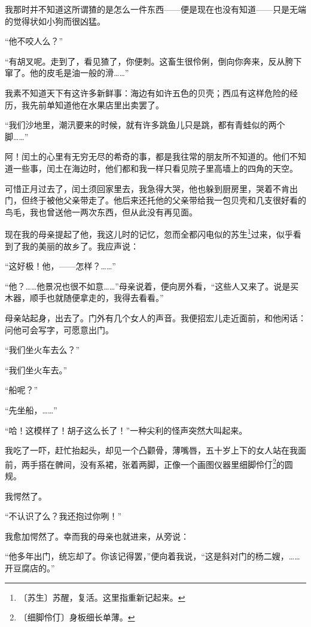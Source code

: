 \documentclass[12pt,UTF-8,openany]{ctexbook}
\begin{document}
\begin{normalsize}
    我那时并不知道这所谓猹的是怎么一件东西——便是现在也没有知道——只是无端的觉得状如小狗而很凶猛。
    
    “他不咬人么？”
    
    “有胡叉呢。走到了，看见猹了，你便刺。这畜生很伶俐，倒向你奔来，反从胯下窜了。他的皮毛是油一般的滑……”
    
    我素不知道天下有这许多新鲜事：海边有如许五色的贝壳；西瓜有这样危险的经历，我先前单知道他在水果店里出卖罢了。
    
    “我们沙地里，潮汛要来的时候，就有许多跳鱼儿只是跳，都有青蛙似的两个脚……”
    
    阿！闰土的心里有无穷无尽的希奇的事，都是我往常的朋友所不知道的。他们不知道一些事，闰土在海边时，他们都和我一样只看见院子里高墙上的四角的天空。
    
    可惜正月过去了，闰土须回家里去，我急得大哭，他也躲到厨房里，哭着不肯出门，但终于被他父亲带走了。他后来还托他的父亲带给我一包贝壳和几支很好看的鸟毛，我也曾送他一两次东西，但从此没有再见面。
    
    现在我的母亲提起了他，我这儿时的记忆，忽而全都闪电似的苏生\footnote{〔苏生〕苏醒，复活。这里指重新记起来。}过来，似乎看到了我的美丽的故乡了。我应声说：
    
    “这好极！他，——怎样？……”
    
    “他？……他景况也很不如意……”母亲说着，便向房外看，“这些人又来了。说是买木器，顺手也就随便拿走的，我得去看看。”
    
    母亲站起身，出去了。门外有几个女人的声音。我便招宏儿走近面前，和他闲话：问他可会写字，可愿意出门。
    
    “我们坐火车去么？”
    
    “我们坐火车去。”
    
    “船呢？”
    
    “先坐船，……”
    
    “哈！这模样了！胡子这么长了！”一种尖利的怪声突然大叫起来。
    
    我吃了一吓，赶忙抬起头，却见一个凸颧骨，薄嘴唇，五十岁上下的女人站在我面前，两手搭在髀间，没有系裙，张着两脚，正像一个画图仪器里细脚伶仃\footnote{〔细脚伶仃〕身板细长单薄。}的圆规。
    
    我愕然了。
    
    “不认识了么？我还抱过你咧！”
    
    我愈加愕然了。幸而我的母亲也就进来，从旁说：
    
    “他多年出门，统忘却了。你该记得罢，”便向着我说，“这是斜对门的杨二嫂，……开豆腐店的。”
    

\end{normalsize}
\end{document}
